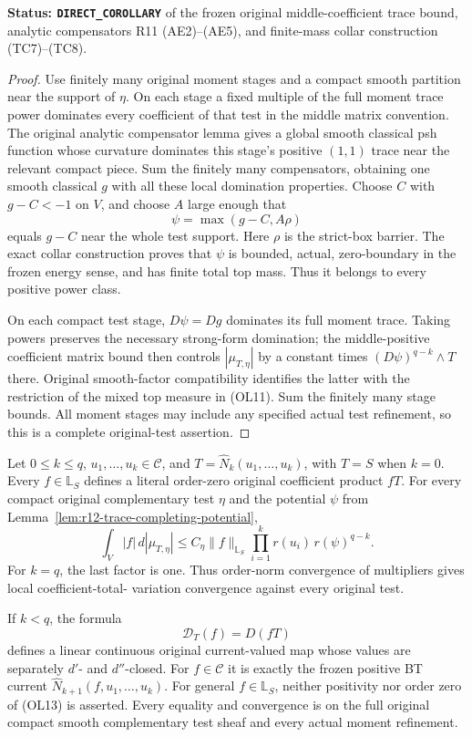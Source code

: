 \noindent\textbf{Status: \texttt{DIRECT\_COROLLARY}} of
the frozen original middle-coefficient trace bound, analytic
compensators R11 \textup{(AE2)--(AE5)}, and finite-mass
collar construction \textup{(TC7)--(TC8)}.

\begin{proof}
Use finitely many original moment stages and a compact
smooth partition near the support of $\eta$.  On each
stage a fixed multiple of the full moment trace power
dominates every coefficient of that test in the middle
matrix convention.  The original analytic compensator
lemma gives a global smooth classical psh function whose
curvature dominates this stage's positive $(1,1)$ trace
near the relevant compact piece.  Sum the finitely many
compensators, obtaining one smooth classical $g$ with
all these local domination properties.  Choose $C$ with
$g-C<-1$ on $V$, and choose $A$ large enough that
\[
                         \psi=\max(g-C,A\rho)
\]
equals $g-C$ near the whole test support.  Here $\rho$
is the strict-box barrier.  The exact collar construction
proves that $\psi$ is bounded, actual, zero-boundary in
the frozen energy sense, and has finite total top mass.
Thus it belongs to every positive power class.

On each compact test stage, $D\psi=Dg$ dominates its
full moment trace.  Taking powers preserves the necessary
strong-form domination; the middle-positive coefficient
matrix bound then controls $|\mu_{T,\eta}|$ by a
constant times $(D\psi)^{q-k}\wedge T$ there.
Original smooth-factor compatibility identifies the latter
with the restriction of the mixed top measure in
\textup{(OL11)}.  Sum the finitely many stage bounds.
All moment stages may include any specified actual test
refinement, so this is a complete original-test assertion.
\end{proof}

\begin{theorem}
\label{thm:r12-lattice-current-multipliers}
Let $0\le k\le q$, $u_1,\ldots,u_k\in\mathscr C$, and
$T=\widehat N_k(u_1,\ldots,u_k)$, with $T=S$ when $k=0$.
Every $f\in\mathbb L_S$ defines a literal order-zero
original coefficient product $fT$.  For every compact
original complementary test $\eta$ and the potential
$\psi$ from Lemma~\ref{lem:r12-trace-completing-potential},
\[
 \int_V|f|\,d|\mu_{T,\eta}|
       \le C_\eta\|f\|_{\mathbb L_S}
                   \prod_{i=1}^k r(u_i)\,r(\psi)^{q-k}.
 \tag{OL12}
\]
For $k=q$, the last factor is one.  Thus order-norm
convergence of multipliers gives local coefficient-total-
variation convergence against every original test.

If $k<q$, the formula
\[
                 \mathcal D_T(f)=D(fT)
 \tag{OL13}
\]
defines a linear continuous original current-valued map
whose values are separately $d'$- and $d''$-closed.
For $f\in\mathscr C$ it is exactly the frozen positive
BT current
$\widehat N_{k+1}(f,u_1,\ldots,u_k)$.
For general $f\in\mathbb L_S$, neither positivity nor
order zero of \textup{(OL13)} is asserted.
Every equality and convergence is on the full original
compact smooth complementary test sheaf and every actual
moment refinement.
\end{theorem}

